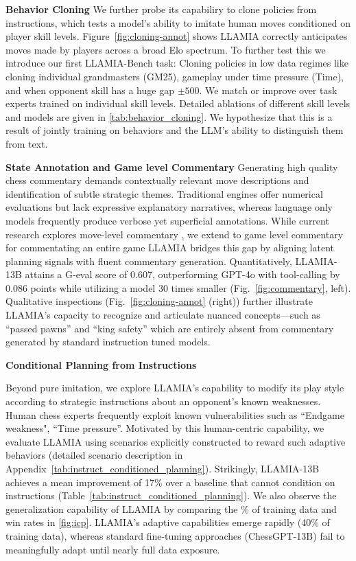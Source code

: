 \documentclass{article}
\theoremstyle{plain}
\theoremstyle{definition}
\theoremstyle{remark}
\begin{document}
\textbf{Behavior Cloning} We further probe its capabiliry to clone policies from instructions, which tests a model’s ability to imitate human moves conditioned on player skill levels. Figure~\ref{fig:cloning-annot} shows LLAMIA correctly anticipates moves made by players across a broad Elo spectrum. To further test this we introduce our first LLAMIA-Bench task: Cloning policies in low data regimes like cloning individual grandmasters (GM25), gameplay under time pressure (Time), and when opponent skill has a huge gap $\pm500$. We match or improve over task experts \cite{mcilroy2020aligning} trained on individual skill levels. Detailed ablations of different skill levels and models are given in \ref{tab:behavior_cloning}. We hypothesize that this is a result of jointly training on behaviors and the LLM's ability to distinguish them from text.

\textbf{State Annotation and Game level Commentary}
\label{sec:grounded_commentary}
Generating high quality chess commentary demands contextually relevant move descriptions and identification of subtle strategic themes. Traditional engines offer numerical evaluations but lack expressive explanatory narratives, whereas language only models frequently produce verbose yet superficial annotations. While current research explores move-level commentary \cite{jhamtani-etal-2018-learning}, we extend to game level commentary for commentating an entire game LLAMIA bridges this gap by aligning latent planning signals with fluent commentary generation. Quantitatively, LLAMIA-13B attains a G-eval \cite{liu2023g} score of 0.607, outperforming GPT-4o with tool-calling by 0.086 points while utilizing a model 30 times smaller (Fig.~\ref{fig:commentary}, left). Qualitative inspections (Fig.~\ref{fig:cloning-annot} (right)) further illustrate LLAMIA’s capacity to recognize and articulate nuanced concepts—such as ``passed pawns'' and ``king safety'' which are entirely absent from commentary generated by standard instruction tuned models. 

\textbf{Conditional Planning from Instructions}
\label{sec:instruction_conditioned_planning}

Beyond pure imitation, we explore LLAMIA’s capability to modify its play style according to strategic instructions about an opponent’s known weaknesses. Human chess experts frequently exploit known vulnerabilities such as ``Endgame weakness", ``Time pressure''. Motivated by this human-centric capability, we evaluate LLAMIA using scenarios explicitly constructed to reward such adaptive behaviors (detailed scenario description in Appendix~\ref{tab:instruct_conditioned_planning}). Strikingly, LLAMIA-13B achieves a mean improvement of 17\% over a baseline that cannot condition on instructions (Table~\ref{tab:instruct_conditioned_planning}).
We also observe the generalization capability of LLAMIA by comparing the \% of training data and win rates in \ref{fig:icp}. LLAMIA’s adaptive capabilities emerge rapidly (40\% of training data), whereas standard fine-tuning approaches (ChessGPT-13B) fail to meaningfully adapt until nearly full data exposure. 
\end{document}
